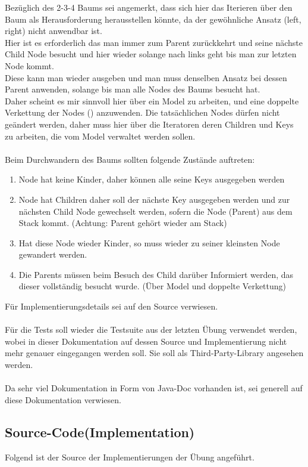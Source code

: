 \documentclass[11pt, a4paper, twoside]{article}   	%
\newcommand{\sourceSection}{Source-Code}
\begin{document}
Bezüglich des 2-3-4 Baums sei angemerkt, dass sich hier das Iterieren über den Baum als Herausforderung herausstellen könnte, da der gewöhnliche Ansatz (left, right) nicht anwendbar ist.\\
Hier ist es erforderlich das man immer zum Parent zurückkehrt und seine nächste Child Node besucht und hier wieder solange nach links geht bis man zur letzten Node kommt.\\
Diese kann man wieder ausgeben und man muss denselben Ansatz bei dessen Parent anwenden, solange bis man alle Nodes des Baums besucht hat.\\
Daher scheint es mir sinnvoll hier über ein Model zu arbeiten, und eine doppelte Verkettung der Nodes () anzuwenden. Die tatsächlichen Nodes dürfen nicht geändert werden, daher muss hier über die Iteratoren deren Children und Keys zu arbeiten, die vom Model verwaltet werden sollen.\\\\
Beim Durchwandern des Baums sollten folgende Zustände auftreten:\\
\begin{enumerate}
	\item Node hat keine Kinder, daher können alle seine Keys ausgegeben werden
	\item Node hat Children daher soll der nächste Key ausgegeben werden und zur nächsten Child Node gewechselt werden, sofern die Node (Parent) aus dem Stack kommt. (Achtung: Parent gehört wieder am Stack)
	\item Hat diese Node wieder Kinder, so muss wieder zu seiner kleinsten Node gewandert werden.
	\item Die Parents müssen beim Besuch des Child darüber Informiert werden, das dieser vollständig besucht wurde. (Über Model und doppelte Verkettung)
\end{enumerate}
Für Implementierungsdetails sei auf den Source verwiesen.\\\\
Für die Tests soll wieder die Testsuite aus der letzten Übung verwendet werden, wobei in dieser Dokumentation auf dessen Source und Implementierung nicht mehr genauer eingegangen werden soll. Sie soll als Third-Party-Library angesehen werden.\\\\
Da sehr viel Dokumentation in Form von Java-Doc vorhanden ist, sei generell auf diese Dokumentation verwiesen.

\newpage
\subsection{\sourceSection (Implementation)}
Folgend ist der Source der Implementierungen der Übung angeführt.\\
\end{document}
